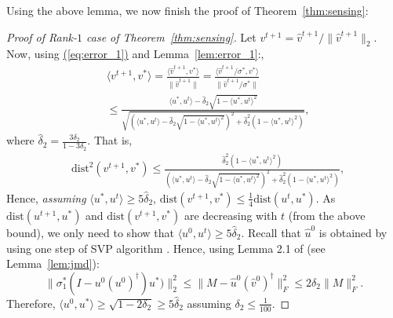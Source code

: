 \documentclass[11pt]{article}
\renewcommand{\eqref}[1]{\hyperref[#1]{(\ref*{#1})}}
\theoremstyle{plain}
\theoremstyle{definition}
\newcommand{\dist}{\mathrm{dist}}
\newcommand{\vto}{v^{t+1}}
\newcommand{\ut}{u^t}
\newcommand{\uo}{u^* }
\newcommand{\vo}{v^* }
\newcommand{\wvto}{\widehat{v}^{t+1}}
\newcommand{\ip}[2]{\langle #1, #2 \rangle}
\newcommand{\vt}{\vto}
\begin{document}
Using the above lemma, we now finish the proof of Theorem~\ref{thm:sensing}: 
\begin{proof}[Proof of Rank-$1$ case of Theorem~\ref{thm:sensing}]
Let $\vt=\wvto/\|\wvto\|_2$. Now, using \eqref{eq:error_1} and Lemma~\ref{lem:error_1}:, 
\begin{align*}
  &\ip{\vto}{\vo}=\frac{\ip{\wvto}{\vo}}{\|\wvto\|}=\frac{\ip{\wvto/\sigma^*}{\vo}}{\|\wvto/\sigma^*\|} \nonumber\\
&\leq \frac{\ip{\uo}{\ut}-\widehat{\delta}_2\sqrt{1-\ip{\uo}{\ut}^2}}{\sqrt{\left(\ip{\uo}{\ut}-\widehat{\delta}_2\sqrt{1-\ip{\uo}{\ut}^2}\right)^2+\widehat{\delta}_2^2\left(1-\ip{\uo}{\ut}^2\right)}},
\end{align*}
where $\widehat{\delta}_2= \frac{3\delta_2}{1-3\delta_2}$. That is, %
\begin{align*}&\dist^2(\vto, \vo) \leq \frac{\widehat{\delta}_2^2(1-\ip{\uo}{\ut}^2)}{(\ip{\uo}{\ut}-\widehat{\delta}_2\sqrt{1-\ip{\uo}{\ut}^2})^2+\widehat{\delta}_2^2(1-\ip{\uo}{\ut}^2)},\end{align*}
Hence, {\em assuming} $\ip{\uo}{\ut}\geq 5\widehat{\delta}_2$, $\dist(\vto, \vo)\leq \frac{1}{4}\dist(\ut, \uo).$
As $\dist(u^{t+1}, \uo)$ and $\dist(v^{t+1}, \vo)$ are decreasing with $t$ (from the above bound), we only need to show that $\ip{u^0}{\ut}\geq 5\widehat{\delta}_2$. 
Recall that $\widehat{u}^0$ is obtained by using one step of SVP algorithm \cite{JainMD10}. Hence, using Lemma 2.1 of \cite{JainMD10} (see Lemma~\ref{lem:jmd}): 
$$\|\sigma_1^*(I-u^0(u^0)^\dag)\uo)\|_2^2\leq \|M-\widehat{u}^0(\widehat{v}^0)^\dag\|_F^2\leq 2\delta_{2}\|M\|_F^2.$$
Therefore, $\ip{u^0}{\uo}\geq \sqrt{1-2\delta_2}\geq 5\widehat{\delta}_2$ assuming $\delta_{2}\leq \frac{1}{100}$. 
\end{proof}
\end{document}
